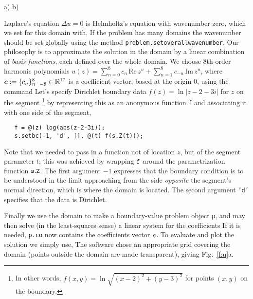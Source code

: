 \bfi %
a)
b)
\efi

Laplace's equation $\Delta u = 0$ is Helmholtz's equation with wavenumber
zero, which we set for this domain with,
If the problem has many domains the wavenumber should be set globally using the
method {\texttt{problem.setoverallwavenumber}}.
Our philosophy is
to approximate the solution in the domain by a linear combination of
{\em basis functions}, each defined over the whole domain.
We choose 8th-order harmonic polynomials
$u(z) = \sum_{n=0}^{8} c_n \,\mbox{Re}\,z^n +
\sum_{n=1}^{8} c_{-n}\,\mbox{Im}\,z^n$, where ${\bm c}:=\{c_n\}_{n=-8}^{8}
\in\mathbb{R}^{17}$
is a coefficient vector, based at the origin 0,
using the command
Let's specify Dirichlet boundary data $f(z) = 
\ln |z-2-3i|$ for
$z$ on the segment%
  \footnote{In other words, $f(x,y) = \ln \sqrt{(x-2)^2+(y-3)^2}$
    for points $(x,y)$ on the boundary.}
by representing this as an anonymous function {\tt f}
and associating it with one side of the segment,
\begin{verbatim}
   f = @(z) log(abs(z-2-3i));
   s.setbc(-1, 'd', [], @(t) f(s.Z(t)));
\end{verbatim}
Note that we needed to pass in a function not of location $z$,
but of the segment parameter $t$;
this was achieved by
wrapping ${\tt f}$ around the parametrization function ${\tt s.Z}$.
The first argument $-1$ expresses that the boundary condition is to be
understood in the limit approaching from the side {\em opposite} the
segment's normal direction, which is where the domain is located.
The second argument {\tt 'd'} specifies that the data is Dirichlet.
 
Finally we use the domain to make a boundary-value
problem object {\tt p},
and may then solve (in the least-squares sense)
a linear system for the coefficients
If it is needed, {\tt p.co} now contains the coefficients vector ${\bm c}$.
To evaluate and plot the solution we simply use,
The software chose an appropriate grid covering the domain
(points outside the domain are made transparent), giving Fig.~\ref{f:u}a.


